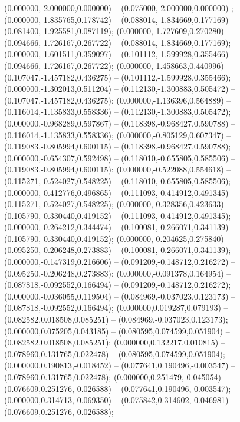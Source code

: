  (0.000000,-2.000000,0.000000) -- (0.075000,-2.000000,0.000000) ;
 (0.000000,-1.835765,0.178742) -- (0.088014,-1.834669,0.177169) -- (0.081400,-1.925581,0.087119);
 (0.000000,-1.727609,0.270280) -- (0.094666,-1.726167,0.267722) -- (0.088014,-1.834669,0.177169);
 (0.000000,-1.601511,0.359097) -- (0.101112,-1.599928,0.355466) -- (0.094666,-1.726167,0.267722);
 (0.000000,-1.458663,0.440996) -- (0.107047,-1.457182,0.436275) -- (0.101112,-1.599928,0.355466);
 (0.000000,-1.302013,0.511204) -- (0.112130,-1.300883,0.505472) -- (0.107047,-1.457182,0.436275);
 (0.000000,-1.136396,0.564889) -- (0.116014,-1.135833,0.558336) -- (0.112130,-1.300883,0.505472);
 (0.000000,-0.968289,0.597867) -- (0.118398,-0.968427,0.590788) -- (0.116014,-1.135833,0.558336);
 (0.000000,-0.805129,0.607347) -- (0.119083,-0.805994,0.600115) -- (0.118398,-0.968427,0.590788);
 (0.000000,-0.654307,0.592498) -- (0.118010,-0.655805,0.585506) -- (0.119083,-0.805994,0.600115);
 (0.000000,-0.522088,0.554618) -- (0.115271,-0.524027,0.548225) -- (0.118010,-0.655805,0.585506);
 (0.000000,-0.412776,0.496865) -- (0.111093,-0.414912,0.491345) -- (0.115271,-0.524027,0.548225);
 (0.000000,-0.328356,0.423633) -- (0.105790,-0.330440,0.419152) -- (0.111093,-0.414912,0.491345);
 (0.000000,-0.264212,0.344474) -- (0.100081,-0.266071,0.341139) -- (0.105790,-0.330440,0.419152);
 (0.000000,-0.204625,0.275840) -- (0.095250,-0.206248,0.273883) -- (0.100081,-0.266071,0.341139);
 (0.000000,-0.147319,0.216606) -- (0.091209,-0.148712,0.216272) -- (0.095250,-0.206248,0.273883);
 (0.000000,-0.091378,0.164954) -- (0.087818,-0.092552,0.166494) -- (0.091209,-0.148712,0.216272);
 (0.000000,-0.036055,0.119504) -- (0.084969,-0.037023,0.123173) -- (0.087818,-0.092552,0.166494);
 (0.000000,0.019287,0.079193) -- (0.082582,0.018508,0.085251) -- (0.084969,-0.037023,0.123173);
 (0.000000,0.075205,0.043185) -- (0.080595,0.074599,0.051904) -- (0.082582,0.018508,0.085251);
 (0.000000,0.132217,0.010815) -- (0.078960,0.131765,0.022478) -- (0.080595,0.074599,0.051904);
 (0.000000,0.190813,-0.018452) -- (0.077641,0.190496,-0.003547) -- (0.078960,0.131765,0.022478);
 (0.000000,0.251479,-0.045054) -- (0.076609,0.251276,-0.026588) -- (0.077641,0.190496,-0.003547);
 (0.000000,0.314713,-0.069350) -- (0.075842,0.314602,-0.046981) -- (0.076609,0.251276,-0.026588);

